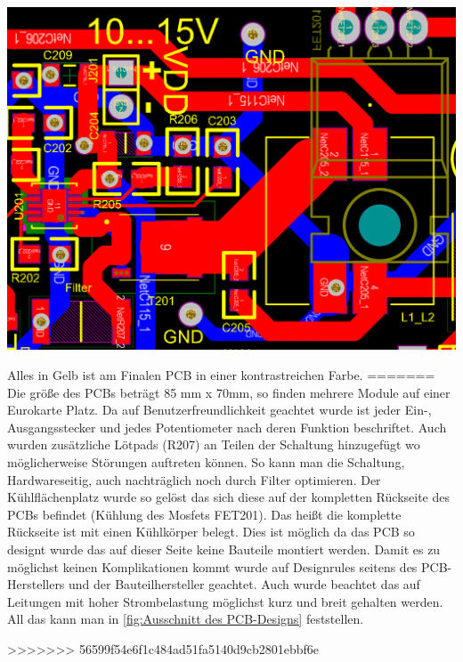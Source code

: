 \documentclass[paper=a4, 12pt]{scrreprt}
\begin{document}
	\begin{adjustbox}{center,caption={Ausschitt des Designs },label={fig:Ausschnitt des PCB-Designs},nofloat=figure,vspace=\bigskipamount}
		\includegraphics[width=\textwidth]{img/PCB-Design.PNG}
	\end{adjustbox}
	Alles in Gelb ist am Finalen PCB in einer kontrastreichen Farbe.
=======
		Die größe des PCBs beträgt 85 mm x 70mm, so finden mehrere Module auf einer Eurokarte Platz. Da auf Benutzerfreundlichkeit geachtet wurde ist jeder Ein-, Ausgangsstecker und jedes Potentiometer nach deren Funktion beschriftet. Auch wurden zusätzliche Lötpads (R207) an Teilen der Schaltung hinzugefügt wo möglicherweise Störungen auftreten können. So kann man die Schaltung, Hardwareseitig, auch nachträglich noch durch Filter optimieren. Der Kühlflächenplatz wurde so gelöst das sich diese auf der kompletten Rückseite des PCBs befindet (Kühlung des Mosfets FET201). Das heißt die komplette Rückseite ist mit einen Kühlkörper belegt. Dies ist möglich da das PCB so designt wurde das auf dieser Seite keine Bauteile montiert werden. Damit es zu möglichst keinen Komplikationen kommt wurde auf Designrules seitens des PCB-Herstellers und der Bauteilhersteller geachtet. Auch wurde beachtet das auf Leitungen mit hoher Strombelastung möglichst kurz und breit gehalten werden. All das kann man in \ref{fig:Ausschnitt des PCB-Designs} feststellen.\hfill \break 
		\begin{adjustbox}{center,caption={Ausschitt des Designs },label={fig:Ausschnitt des PCB-Designs},nofloat=figure,vspace=\bigskipamount}
		\end{adjustbox}
	\newpage
>>>>>>> 56599f54e6f1c484ad51fa5140d9cb2801ebbf6e
\end{document}
